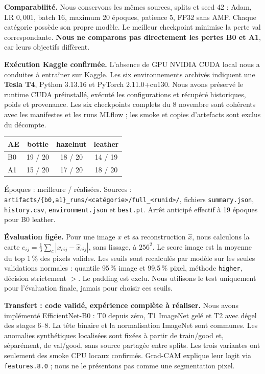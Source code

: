 \documentclass[10pt,a4paper]{article}
\newcommand{\source}[1]{\par{\fontsize{8.5}{10}\selectfont\color{muted}\raggedright #1\par}}
\begin{document}
\textbf{Comparabilité.} Nous conservons les mêmes sources, splits et seed 42 : Adam, LR $0{,}001$, batch 16, maximum 20 époques, patience 5, FP32 sans AMP. Chaque catégorie possède son propre modèle. Le meilleur checkpoint minimise la perte val correspondante. \textbf{Nous ne comparons pas directement les pertes B0 et A1}, car leurs objectifs diffèrent.

\textbf{Exécution Kaggle confirmée.} L'absence de GPU NVIDIA CUDA local nous a conduites à entraîner sur Kaggle. Les six environnements archivés indiquent une \textbf{Tesla T4}, Python 3.13.16 et PyTorch 2.11.0+cu130. Nous avons préservé le runtime CUDA préinstallé, exécuté les configurations et récupéré historiques, poids et provenance. Les six checkpoints complets du 8 novembre sont cohérents avec les manifestes et les runs MLflow ; les smoke et copies d'artefacts sont exclus du décompte.

\par\begin{tabularx}{\linewidth}{@{}p{20mm}CCC@{}}
\toprule
\textbf{AE} & \textbf{bottle} & \textbf{hazelnut} & \textbf{leather}\\
\midrule
B0 & 19 / 20 & 18 / 20 & 14 / 19\\
A1 & 15 / 20 & 17 / 20 & 18 / 20\\
\bottomrule
\end{tabularx}
\source{Époques : meilleure / réalisées. Sources : \texttt{artifacts/\{b0,a1\}\_runs/<catégorie>/full\_<runid>/}, fichiers \texttt{summary.json}, \texttt{history.csv}, \texttt{environment.json} et \texttt{best.pt}. Arrêt anticipé effectif à 19 époques pour B0 leather.}

\textbf{Évaluation figée.} Pour une image $x$ et sa reconstruction $\hat x$, nous calculons la carte $e_{ij}=\frac{1}{3}\sum_c|x_{cij}-\hat x_{cij}|$, sans lissage, à $256^2$. Le score image est la moyenne du top 1\,\% des pixels valides. Les seuils sont recalculés par modèle sur les seules validations normales : quantile 95\,\% image et 99,5\,\% pixel, méthode \texttt{higher}, décision strictement $>$. Le padding est exclu. Nous utilisons le test uniquement pour l'évaluation finale, jamais pour choisir ces seuils.

\textbf{Transfert : code validé, expérience complète à réaliser.} Nous avons implémenté EfficientNet-B0 : T0 depuis zéro, T1 ImageNet gelé et T2 avec dégel des stages 6--8. La tête binaire et la normalisation ImageNet sont communes. Les anomalies synthétiques localisées sont fixées à partir de train/good et, séparément, de val/good, sans source partagée entre splits. Les trois variantes ont seulement des smoke CPU locaux confirmés. Grad-CAM explique leur logit via \texttt{features.8.0} ; nous ne le présentons pas comme une segmentation pixel.
\end{document}
